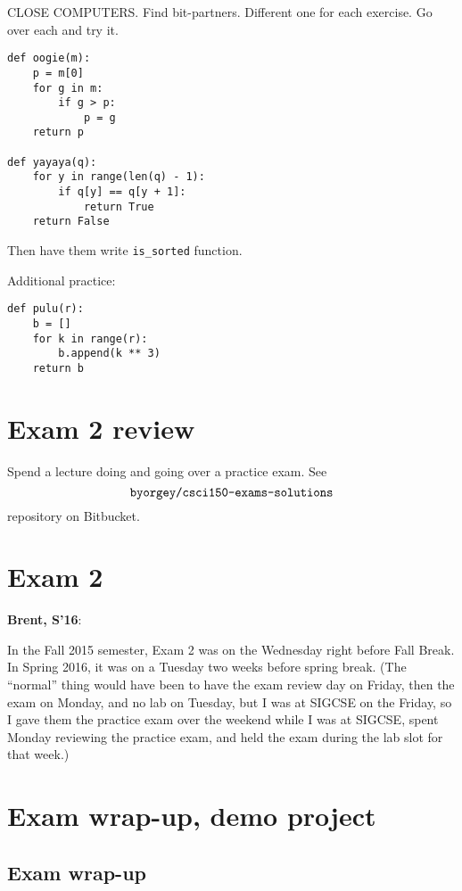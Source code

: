 \documentclass{article}
\newenvironment{reflect}[1]
{
  \noindent
  \begin{lrbox}{\reflectbox}
    \begin{minipage}[t]{\textwidth}
      \textbf{#1}:
}{
    \end{minipage}
  \end{lrbox}
  \fbox{\usebox{\reflectbox}}
}
\begin{document}
CLOSE COMPUTERS.
Find bit-partners. Different one for each exercise.
Go over each and try it.

\begin{verbatim}
def oogie(m):
    p = m[0]
    for g in m:
        if g > p:
            p = g
    return p

def yayaya(q):
    for y in range(len(q) - 1):
        if q[y] == q[y + 1]:
            return True
    return False
\end{verbatim}

Then have them write \verb|is_sorted| function.

Additional practice:

\begin{verbatim}
def pulu(r):
    b = []
    for k in range(r):
        b.append(k ** 3)
    return b
\end{verbatim}

\section{Exam 2 review}

Spend a lecture doing and going over a practice exam.  See
\[ \verb|byorgey/csci150-exams-solutions| \] repository on Bitbucket.

\section{Exam 2}

\begin{reflect}{Brent, S'16}
  In the Fall 2015 semester, Exam 2 was on the Wednesday right before
  Fall Break.  In Spring 2016, it was on a Tuesday two weeks before
  spring break. (The ``normal'' thing would have been to have the exam
  review day on Friday, then the exam on Monday, and no lab on
  Tuesday, but I was at SIGCSE on the Friday, so I gave them the
  practice exam over the weekend while I was at SIGCSE, spent Monday
  reviewing the practice exam, and held the exam during the lab slot
  for that week.)
\end{reflect}

\section{Exam wrap-up, demo project}

\subsection*{Exam wrap-up}
\end{document}

